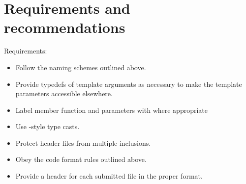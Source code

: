 \section{Requirements and recommendations}
\label{sec:code_format_doc_req_and_rec}

\noindent
Requirements:
\begin{itemize}
   \item Follow the naming schemes outlined above.
   \item Provide typedefs of template arguments as necessary to make the
         template parameters accessible elsewhere.
   \item Label member function and parameters with  where 
         appropriate
   \item Use \CC-style type casts.
   \item Protect header files from multiple inclusions.
   \item Obey the code format rules outlined above.
   \item Provide a header for each submitted file in the proper format.
\end{itemize}
